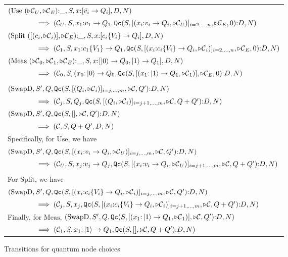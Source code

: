 \begin{figure}[htbp]
\begin{tabular}{l}
$(\mathrm{Use}\ (\lbl_U,\lbl_{E}){:}\_,S,x{:}[\bar{v_i}\to Q_i],D,N) $ \\
$\qquad\qquad\implies (\mathcal{C}_U,S,x_1{:}v_1\to Q_1, 
	\text{\texttt{Qc}}{}(S,[(x_i{:}v_i\to Q_i,{\triangleright\mathcal{C}}_U)]_{i=2,\ldots,n},{\triangleright\mathcal{C}}_E, 0){:}D,N)$ \\[12pt]
$(\mathrm{Split}\ ([(c_i,\lbl_i)],\lbl_E){:}\_,S,x{:}[c_i\{V_i\}\to Q_i],D,N) $ \\
$\qquad\qquad\implies (\mathcal{C}_1,S,x_1{:}c_1\{V_1\}\to Q_1, 
	\text{\texttt{Qc}}{}(S,[(x_i{:}c_i\{V_i\}\to Q_i, {\triangleright\mathcal{C}}_i)]_{i=2,\ldots,n},{\triangleright\mathcal{C}}_E, 0){:}D,N)$ \\[12pt]
$(\mathrm{Meas}\ (\lbl_0, \lbl_1,\lbl_E){:}\_,S,x{:}[\ket{0}\to Q_0,\ket{1}\to Q_1],D,N) $ \\
$\qquad\qquad\implies (\mathcal{C}_0,S,(x_0{:}\left\vert{0}\right\rangle\to Q_0, 
       \text{\texttt{Qc}}{}(S,[(x_1{:}\left\vert{1}\right\rangle\to 
	Q_1,{\triangleright\mathcal{C}}_1)],{\triangleright\mathcal{C}}_E, 0){:}D,N)$ \\[12pt]
\\
$(\mathrm{SwapD},S',Q,\text{\texttt{Qc}}{}(S,
	[(Q_i,{\triangleright\mathcal{C}}_i)]_{i=j,\ldots,m},\triangleright\mathcal{C}, Q'){:}D,N) 
       $ \\
$\qquad\qquad\implies ({\mathcal{C}}_j,S,Q_j, \text{\texttt{Qc}}{}
	(S,[(Q_i,{\triangleright\mathcal{C}}_i)]_{i=j+1,\ldots,m},\triangleright\mathcal{C},Q+Q'){:}D,N)$ \\[12pt]
$(\mathrm{SwapD},S',Q,\text{\texttt{Qc}}{}(S,[],\triangleright\mathcal{C}, Q'){:}D,N) 
       $ \\
$\qquad\qquad\implies (\mathcal{C},S,Q+Q', D,N)$\\[12pt]
Specifically, for $\mathrm{Use}$, we have\\
$(\mathrm{SwapD},S',Q,\text{\texttt{Qc}}{}(S,
	[(x_i{:}v_i\to Q_i,{\triangleright\mathcal{C}}_U)]_{i=j,\ldots,m},\triangleright\mathcal{C}, Q'){:}D,N) 
       $ \\
$\qquad\qquad\implies ({\mathcal{C}}_U,S,x_j{:}v_j\to Q_j, \text{\texttt{Qc}}{}
	(S,[(x_i{:}v_i\to Q_i,{\triangleright\mathcal{C}}_U)]_{i=j+1,\ldots,m},\triangleright\mathcal{C},Q+Q'){:}D,N)$ \\[12pt]
\\
For $\mathrm{Split}$, we have\\
$(\mathrm{SwapD},S',Q,\text{\texttt{Qc}}{}(S,[(x_i{:}c_i\{V_i\}\to Q_i, {\triangleright\mathcal{C}}_i)]_{i=j,\ldots,m},\triangleright\mathcal{C}, Q'){:}D,N) 
       $ \\
$\qquad\qquad\implies ({\mathcal{C}}_j,S,x_j, \text{\texttt{Qc}}{}(S,[(x_i{:}c_i\{V_i\}\to Q_i, {\triangleright\mathcal{C}}_i)]_{i=j+1,\ldots,m},\triangleright\mathcal{C},Q+Q'){:}D,N)$ \\[12pt]
Finally, for $\mathrm{Meas}$, 
$(\mathrm{SwapD},S',Q, \text{\texttt{Qc}}{}(S,
	[(x_1{:}\left\vert{1}\right\rangle\to Q_1,{\triangleright\mathcal{C}}_1)],\triangleright\mathcal{C}, Q'){:}D,N) 
       $ \\
$\qquad\qquad\implies ({\mathcal{C}}_1,S,x_1{:}\left\vert{1}\right\rangle\to Q_1,  
	\text{\texttt{Qc}}{}(S,[],\triangleright\mathcal{C},Q+Q'){:}D,N)$ \\[12pt]
\end{tabular}
\caption{Transitions for quantum node choices}\label{fig:trans:measures}
\end{figure}

